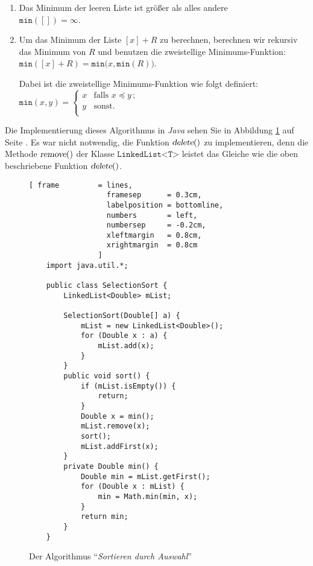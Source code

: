 \begin{enumerate}
\item Das Minimum der leeren Liste ist gr\"o{\ss}er als alles andere \\[0.1cm]
      \hspace*{1.3cm} $\mathtt{min}([]) = \infty$.
\item Um das Minimum der Liste $[x] + R$ zu berechnen, berechnen wir rekursiv das Minimum
      von $R$ und benutzen die zweistellige Minimums-Funktion: \\[0.1cm]
      \hspace*{1.3cm} 
      $\mathtt{min}([x] + R) = \mathtt{min}\bigl(x, \mathtt{min}(R) \bigr)$. 

      Dabei ist die zweistellige Minimums-Funktion wie folgt definiert: \\[0.1cm]
      \hspace*{1.3cm} 
      $\mathtt{min}(x,y) = \left\{
      \begin{array}{ll}
        x  & \mbox{falls $x \preceq y\,$;} \\
        y  & \mbox{sonst.} \\
      \end{array}\right.
      $
\end{enumerate}
Die Implementierung dieses Algorithmus in \textsl{Java} sehen Sie in Abbildung
\ref{fig:selection-sort} auf Seite \pageref{fig:selection-sort}.  Es war nicht notwendig,
die Funktion $\textsl{delete}()$ zu implementieren, denn die Methode $\textsl{remove}()$
der Klasse $\texttt{LinkedList<T>}$ leistet das Gleiche wie die oben beschriebene Funktion
$\textsl{delete}()$.

\begin{figure}[!ht]
  \centering
\begin{Verbatim}[ frame         = lines, 
                  framesep      = 0.3cm, 
                  labelposition = bottomline,
                  numbers       = left,
                  numbersep     = -0.2cm,
                  xleftmargin   = 0.8cm,
                  xrightmargin  = 0.8cm
                ]
    import java.util.*;
    
    public class SelectionSort {
        LinkedList<Double> mList;
        
        SelectionSort(Double[] a) {
            mList = new LinkedList<Double>();
            for (Double x : a) {
                mList.add(x);
            }
        }
        public void sort() {
            if (mList.isEmpty()) {
                return;
            }
            Double x = min();
            mList.remove(x);
            sort();
            mList.addFirst(x);
        }    
        private Double min() {
            Double min = mList.getFirst();
            for (Double x : mList) {
                min = Math.min(min, x);
            }
            return min;
        }
    }
\end{Verbatim}
\vspace*{-0.3cm}
  \caption{Der Algorithmus ``\emph{Sortieren durch Auswahl}''}
  \label{fig:selection-sort}
\end{figure}

